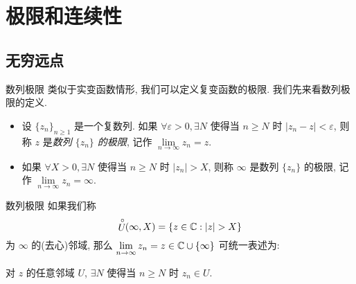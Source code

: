 \section{极限和连续性}


\subsection{无穷远点}
\begin{frame}{数列极限}
	\onslide<+->
	类似于实变函数情形, 我们可以定义复变函数的极限.
	\onslide<+->
	我们先来看数列极限的定义.

	\begin{definition}
		\begin{itemize}
		\item 设 $\{z_n\}_{n\ge 1}$ 是一个复数列.
			\alert{如果 $\forall \varepsilon>0,\exists N$ 使得当 $n\ge N$ 时 $|z_n-z|<\varepsilon$}, 则称 $z$ 是\emph{数列 $\{z_n\}$ 的极限}, 记作 \emph{$\lim\limits_{n\to\infty}z_n=z$}.
		\item 如果 \alert{$\forall X>0,\exists N$ 使得当 $n\ge N$ 时 $|z_n|>X$}, 则称 $\infty$ 是数列 $\{z_n\}$ 的极限, 记作 $\lim\limits_{n\to\infty}z_n=\infty$.
		\end{itemize}
	\end{definition}
\end{frame}


\begin{frame}{数列极限}
	\onslide<+->
	如果我们称
	\[\Uc(\infty,X)=\set{z\in\BC:|z|>X}\]
	为 $\infty$ 的(去心)邻域,
	\onslide<+->
	那么 $\lim\limits_{n\to\infty}z_n=z\in{\mathbb{C}}\cup{\left\{\infty\right\}}$ 可统一表述为:

	\onslide<+->
	\begin{block@}
		对 $z$ 的任意邻域 $U$, $\exists N$ 使得当 $n\ge N$ 时 $z_n\in U$.
	\end{block@}

	\begin{center}
	\end{center}
\end{frame}


